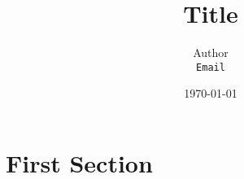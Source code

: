 \documentclass[12pt]{scrartcl}
\title{Title} %
\author{Author\\ \texttt{Email}} %
\date{\today} %
\begin{document}
\maketitle %

\section{First Section}


\end{document}
